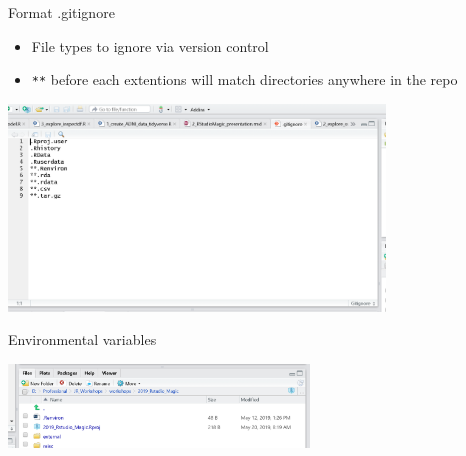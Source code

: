 \documentclass[
  ignorenonframetext,
]{beamer}
\providecommand{\tightlist}{%
  \setlength{\itemsep}{0pt}\setlength{\parskip}{0pt}}
\begin{document}
\begin{frame}[fragile]{Format .gitignore}
\protect\hypertarget{format-.gitignore}{}

\begin{itemize}
\tightlist
\item
  File types to ignore via version control
\item
  \texttt{**} before each extentions will match directories anywhere in
  the repo
\end{itemize}

\includegraphics[width=0.75\textwidth,height=\textheight]{../external/images/gitignore.PNG}

\end{frame}

\begin{frame}{Environmental variables}
\protect\hypertarget{environmental-variables}{}

\includegraphics[width=0.6\textwidth,height=\textheight]{../external/images/Revniron.PNG}

\end{frame}
\end{document}
